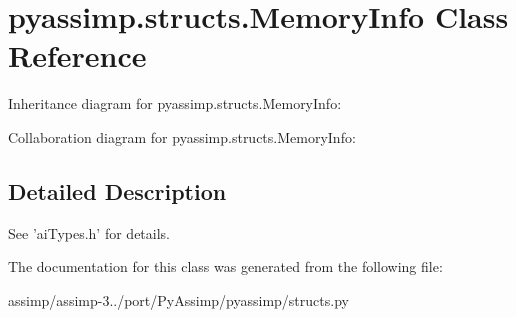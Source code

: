 \hypertarget{classpyassimp_1_1structs_1_1_memory_info}{\section{pyassimp.\+structs.\+Memory\+Info Class Reference}
\label{classpyassimp_1_1structs_1_1_memory_info}
}


Inheritance diagram for pyassimp.\+structs.\+Memory\+Info\+:


Collaboration diagram for pyassimp.\+structs.\+Memory\+Info\+:


\subsection{Detailed Description}
\begin{DoxyVerb}See 'aiTypes.h' for details.
\end{DoxyVerb}
 

The documentation for this class was generated from the following file\+:\begin{DoxyCompactItemize}
\item 
assimp/assimp-\/3../port/\+Py\+Assimp/pyassimp/structs.\+py\end{DoxyCompactItemize}
